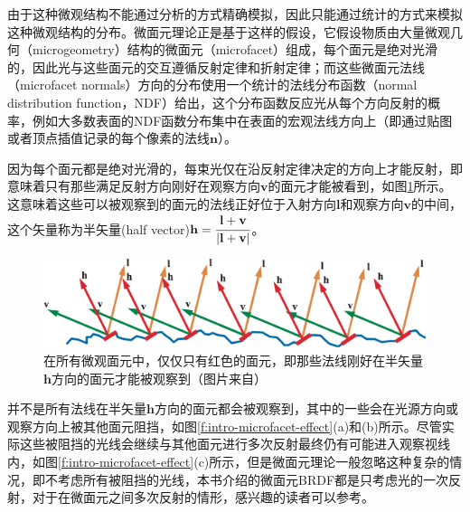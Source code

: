 由于这种微观结构不能通过分析的方式精确模拟，因此只能通过统计的方式来模拟这种微观结构的分布。微面元理论正是基于这样的假设，它假设物质由大量微观几何（microgeometry）结构的微面元（microfacet）组成，每个面元是绝对光滑的，因此光与这些面元的交互遵循反射定律和折射定律；而这些微面元法线（microfacet normals）方向的分布使用一个统计的法线分布函数（normal distribution function，NDF）给出，这个分布函数反应光从每个方向反射的概率，例如大多数表面的NDF函数分布集中在表面的宏观法线方向上（即通过贴图或者顶点插值记录的每个像素的法线$\mathbf{n}$）。

因为每个面元都是绝对光滑的，每束光仅在沿反射定律决定的方向上才能反射，即意味着只有那些满足反射方向刚好在观察方向$\mathbf{v}$的面元才能被看到，如图\ref{f:intro-microfacet}所示。这意味着这些可以被观察到的面元的法线正好位于入射方向$\mathbf{l}$和观察方向$\mathbf{v}$的中间，这个矢量称为半矢量(half vector)$\mathbf{h}= \cfrac{\mathbf{l}+\mathbf{v}}{|\mathbf{l}+\mathbf{v}|}$。

\begin{figure}
	\includegraphics[width=\textwidth]{graphics/gi/ray-optics-9}
	\caption{在所有微观面元中，仅仅只有红色的面元，即那些法线刚好在半矢量$\mathbf{h}$方向的面元才能被观察到（图片来自\cite{b:rtr}）}
	\label{f:intro-microfacet}
\end{figure}

并不是所有法线在半矢量$\mathbf{h}$方向的面元都会被观察到，其中的一些会在光源方向或观察方向上被其他面元阻挡，如图\ref{f:intro-microfacet-effect}(a)和(b)所示。尽管实际这些被阻挡的光线会继续与其他面元进行多次反射最终仍有可能进入观察视线内，如图\ref{f:intro-microfacet-effect}(c)所示，但是微面元理论一般忽略这种复杂的情况，即不考虑所有被阻挡的光线，本书介绍的微面元BRDF都是只考虑光的一次反射，对于在微面元之间多次反射的情形，感兴趣的读者可以参考\cite{a:MultidimensionalBinarySearchTreesUsedforAssociativeSearching}。

